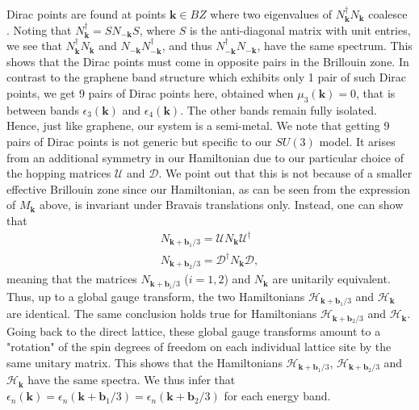 \documentclass[aps,pra,showpacs,twocolumn,superscriptaddress]{revtex4-1}
\begin{document}
Dirac points are found at points $\mathbf{k} \in BZ$ where two eigenvalues of 
$N_{\mathbf{k}}^{\dagger}N_{\mathbf{k}}$ coalesce \cite{Comment2}. 
Noting that $N_{\mathbf{k}}^{\dagger} = S N_{\mathbf{-k}} S$, where $S$ is the anti-diagonal matrix with unit entries, 
we see that $N_{\mathbf{k}}^{\dagger} N_{\mathbf{k}}$ and $N_{\mathbf{-k}}N_{\mathbf{-k}}^{\dagger}$, 
and thus $N_{\mathbf{-k}}^{\dagger} N_{\mathbf{-k}}$, have the same spectrum. 
This shows that the Dirac points must come in opposite pairs in the Brillouin zone. 
In contrast to the graphene band structure which exhibits only 1 pair of such Dirac points, 
we get 9 pairs of Dirac points here, obtained when $\mu_3(\mathbf{k})=0$, 
that is between bands $\epsilon_3(\mathbf{k})$ and $\epsilon_4(\mathbf{k})$. 
The other bands remain fully isolated. Hence, just like graphene, our system is a semi-metal. 
We note that getting 9 pairs of Dirac points is not generic but specific to our $SU(3)$ model. 
It arises from an additional symmetry in our Hamiltonian due to our particular choice of the 
hopping matrices $\mathcal{U}$ and $\mathcal{D}$. 
We point out that this is not because of a smaller effective Brillouin zone since our Hamiltonian, 
as can be seen from the expression of $M_{\mathbf{k}}$ above, is invariant under Bravais translations only. 
Instead, one can show that 
\begin{align}
	N_{\mathbf{k}+\mathbf{b}_1/3}=\mathcal{U} N_{\mathbf{k}}\mathcal{U}^\dagger \\
	N_{\mathbf{k}+\mathbf{b}_2/3}=\mathcal{D}^{\dagger}N_{\mathbf{k}}\mathcal{D}, 
\end{align}
meaning that the matrices $N_{\mathbf{k}+\mathbf{b}_i/3}$ ($i=1,2$) and $N_{\mathbf{k}}$ are unitarily equivalent. 
Thus, up to a global gauge transform, 
the two Hamiltonians $\mathcal{H}_{\mathbf{k}+\mathbf{b}_1/3}$ and $\mathcal{H}_{\mathbf{k}}$ are identical. 
The same conclusion holds true for Hamiltonians $\mathcal{H}_{\mathbf{k}+\mathbf{b}_2/3}$ and $\mathcal{H}_{\mathbf{k}}$. 
Going back to the direct lattice, these global gauge transforms amount to a "rotation" of the spin 
degrees of freedom on each individual lattice site by the same unitary matrix. 
This shows that the Hamiltonians $\mathcal{H}_{\mathbf{k}+\mathbf{b}_1/3}$, 
$\mathcal{H}_{\mathbf{k}+\mathbf{b}_2/3}$ and $\mathcal{H}_{\mathbf{k}}$ have the same spectra. 
We thus infer that $\epsilon_n(\mathbf{k}) = \epsilon_n(\mathbf{k} +\mathbf{b}_1/3) = 
\epsilon_n(\mathbf{k} +\mathbf{b}_2/3)$ for each energy band. 
 
\end{document}
